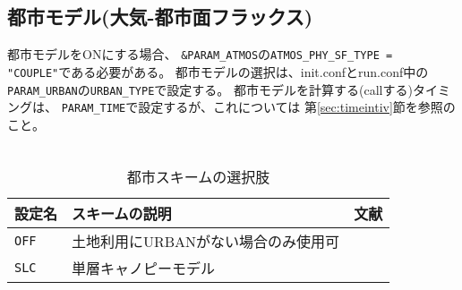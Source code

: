 \subsection{都市モデル(大気-都市面フラックス)} \label{sec:basic_urban}

都市モデルをONにする場合、
\verb|&PARAM_ATMOS|の\verb|ATMOS_PHY_SF_TYPE = "COUPLE"|である必要がある。
都市モデルの選択は、init.confとrun.conf中の
\verb|PARAM_URBAN|の\verb|URBAN_TYPE|で設定する。
都市モデルを計算する(callする)タイミングは、
\verb|PARAM_TIME|で設定するが、これについては
第\ref{sec:timeintiv}節を参照のこと。\\

\\

\begin{table}[h]
\begin{center}
  \caption{都市スキームの選択肢}
  \label{tab:nml_urban}
  \begin{tabularx}{150mm}{llX} \hline
    \rowcolor[gray]{0.9}  設定名 & スキームの説明 & 文献\\ \hline
      \verb|OFF|  & 土地利用にURBANがない場合のみ使用可 &   \\
      \verb|SLC|  & 単層キャノピーモデル   & \citet{kusaka_2001} \\
    \hline
  \end{tabularx}
\end{center}
\end{table}
